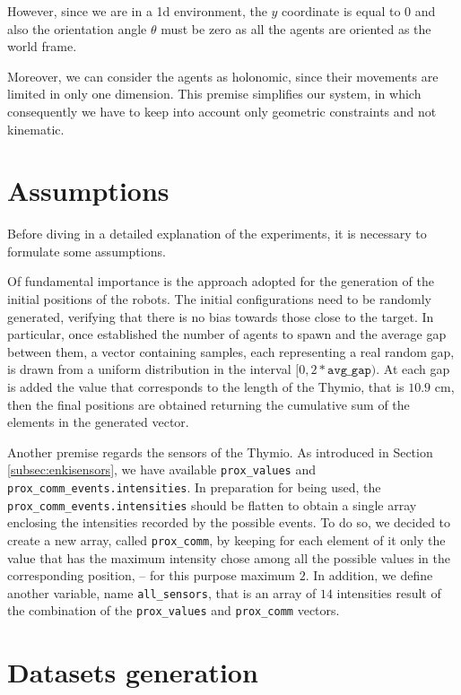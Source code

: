 However, since we are in a \gls{1d} environment, the $y$ coordinate is equal 
to $0$ and also the orientation angle $\theta$ must be zero as all the agents are 
oriented as the world frame. 

Moreover, we can consider the agents as holonomic, since their movements are 
limited in only one dimension. This premise simplifies our system, in which 
consequently we have to keep into account only geometric constraints and not
kinematic.

\section{Assumptions}
\label{sec:assum}
Before diving in a detailed explanation of the experiments, it is necessary to 
formulate some assumptions.

Of fundamental importance is the approach adopted for the generation of the 
initial positions of the robots.
The initial configurations need to be randomly generated, verifying that there is 
no bias towards those close to the target.
In particular, once established the number of agents to spawn and the average 
gap between them, a vector containing samples, each representing a real random 
gap, is drawn from a uniform distribution in the interval $[0, 
2*\mathtt{avg\_gap})$. 
At each gap is added the value that corresponds to the length of the Thymio, that 
is $10.9$ \gls{cm}, then the final positions are obtained returning the 
cumulative sum of the elements in the generated vector. 

Another premise regards the sensors of the Thymio. 
As introduced in Section \ref{subsec:enkisensors}, we have available 
\texttt{prox\_values} and \texttt{prox\_comm\_events.intensities}. In preparation 
for being used, the \texttt{prox\_comm\_events.intensities} should be flatten to 
obtain a single array enclosing the intensities recorded by the possible events. 
To do so, we decided to create a new array, called \texttt{prox\_comm}, by 
keeping for each element of it only the value that has the maximum intensity 
chose among all the possible values in the corresponding position, – for this 
purpose maximum $2$.
In addition, we define another variable, name \texttt{all\_sensors}, that is an array 
of $14$ intensities result of the combination of the \texttt{prox\_values} and 
\texttt{prox\_comm} vectors.

\section{Datasets generation}
\label{sec:dataset}


